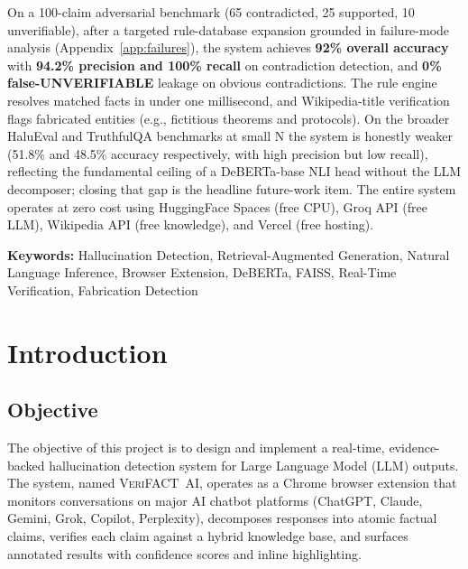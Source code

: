 \documentclass[12pt, a4paper, oneside]{report}
\newcommand{\verifact}{\textsc{VeriFACT~AI}}
\begin{document}
On a 100-claim adversarial benchmark (65 contradicted, 25 supported, 10 unverifiable), after a targeted rule-database expansion grounded in failure-mode analysis (Appendix~\ref{app:failures}), the system achieves \textbf{92\% overall accuracy} with \textbf{94.2\% precision and 100\% recall} on contradiction detection, and \textbf{0\% false-UNVERIFIABLE} leakage on obvious contradictions. The rule engine resolves matched facts in under one millisecond, and Wikipedia-title verification flags fabricated entities (e.g., fictitious theorems and protocols). On the broader HaluEval and TruthfulQA benchmarks at small N the system is honestly weaker (51.8\% and 48.5\% accuracy respectively, with high precision but low recall), reflecting the fundamental ceiling of a DeBERTa-base NLI head without the LLM decomposer; closing that gap is the headline future-work item. The entire system operates at zero cost using HuggingFace Spaces (free CPU), Groq API (free LLM), Wikipedia API (free knowledge), and Vercel (free hosting).

\textbf{Keywords:} Hallucination Detection, Retrieval-Augmented Generation, Natural Language Inference, Browser Extension, DeBERTa, FAISS, Real-Time Verification, Fabrication Detection

\tableofcontents
\listoffigures
\listoftables

\chapter{Introduction}
\label{ch:intro}

\section{Objective}

The objective of this project is to design and implement a real-time, evidence-backed hallucination detection system for Large Language Model (LLM) outputs. The system, named \verifact{}, operates as a Chrome browser extension that monitors conversations on major AI chatbot platforms (ChatGPT, Claude, Gemini, Grok, Copilot, Perplexity), decomposes responses into atomic factual claims, verifies each claim against a hybrid knowledge base, and surfaces annotated results with confidence scores and inline highlighting.
\end{document}
